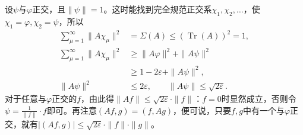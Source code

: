 \documentclass[fontsize=13pt,twoside,openany,headings=normal,parskip=false,bookmarkpackage=false,DIV=calc]{scrbook}
\begin{document}
设$\psi$与$\varphi$正交，且$\|\psi\|=1$。这时能找到完全规范正交系$\chi_1,\allowbreak \chi_2,\allowbreak \ldots$，使$\chi_1=\varphi,\allowbreak \chi_2=\psi$，所以
\begin{align*}
\sum_{\mu=1}^{\infty}\|A\chi_\mu\|^2
&=\Sigma(A)\leq(\operatorname{Tr}(A))^2=1,\\
\sum_{\mu=1}^{\infty}\|A\chi_\mu\|^2
&\geq\|A\varphi\|^2+\|A\psi\|^2\\
&\geq1-2\varepsilon+\|A\psi\|^2,\\
\|A\psi\|^2&\leq2\varepsilon,\qquad\|A\psi\|\leq\sqrt{2\varepsilon}.
\end{align*}
对于任意与$\varphi$正交的$f$，由此得$\|Af\|\leq\sqrt{2\varepsilon}\cdot\|f\|$：$f=0$时显然成立，否则令$\psi=\frac1{\|f\|}\cdot f$即可。再注意$(Af,\allowbreak g)=(f,\allowbreak Ag)$，便可说，只要$f,\allowbreak g$中有一个与$\varphi$正交，就有$|(Af,\allowbreak g)|\leq\sqrt{2\varepsilon}\cdot\|f\|\cdot\|g\|$。
\end{document}
